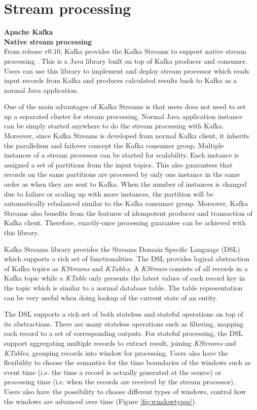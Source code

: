 \section{Stream processing}
\large \textbf{Apache Kafka}\\
\normalsize
\textbf{Native stream processing}\\
From release v0.10, Kafka provides the Kafka Streams to support native stream processing \cite{kafkastreams}. This is a Java library built on top of Kafka producer and consumer. Users can use this library to implement and deploy stream processor which reads input records from Kafka and produces calculated results back to Kafka as a normal Java application. 

One of the main advantages of Kafka Streams is that users does not need to set up a separated cluster for stream processing. Normal Java application instance can be simply started anywhere to do the stream processing with Kafka. Moreover, since Kafka Streams is developed from normal Kafka client, it inherits the parallelism and failover concept the Kafka consumer group. Multiple instances of a stream processor can be started for scalability. Each instance is assigned a set of partitions from the input topics. This also guarantees that records on the same partitions are processed by only one instance in the same order as when they are sent to Kafka. When the number of instances is changed due to failure or scaling up with more instances, the partition will be automatically rebalanced similar to the Kafka consumer group. Moreover, Kafka Streams also benefits from the features of idempotent producer and transaction of Kafka client. Therefore, exactly-once processing guarantee can be achieved with this library.

Kafka Streams library provides the Streams Domain Specific Language (DSL) which supports a rich set of functionalities. The DSL provides logical abstraction of Kafka topics as \emph{KStreams} and \emph{KTables}. A \emph{KStream} consists of all records in a Kafka topic while a \emph{KTable} only presents the latest values of each record key in the topic which is similar to a normal database table. The table representation can be very useful when doing lookup of the current state of an entity. 

The DSL supports a rich set of both stateless and stateful operations on top of its abstractions. There are many stateless operations such as filtering, mapping each record to a set of corresponding outputs. For stateful processing, the DSL support aggregating multiple records to extract result, joining \emph{KStreams} and \emph{KTables}, grouping records into window for processing. Users also have the flexibility to choose the semantics for the time boundaries of the windows such as event time (i.e. the time a record is actually generated at the source) or processing time (i.e. when the records are received by the stream processor). Users also have the possibility to choose different types of windows, control how the windows are advanced over time (Figure \ref{fig:windowtypes}).

